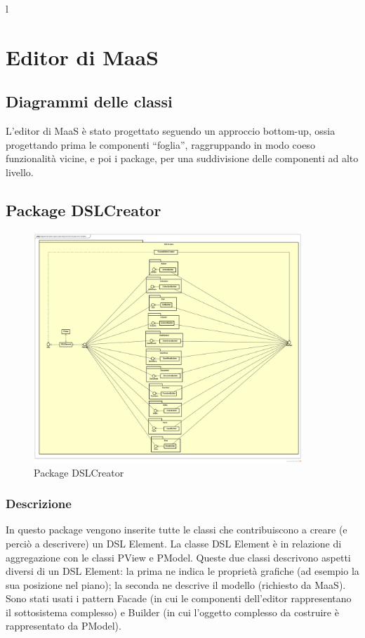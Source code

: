 l\section{Editor di MaaS}
        \subsection{Diagrammi delle classi}
        L'editor di MaaS è stato progettato seguendo un approccio bottom-up, ossia progettando prima le componenti ``foglia'', raggruppando in modo coeso funzionalità vicine, e poi i package, per una suddivisione delle componenti ad alto livello.
        \subsection{Package DSLCreator}
        \begin{figure}[H]
          \centering
          \includegraphics[width=0.9\textwidth]{res/img/diagram_facade.png}
          \caption{Package DSLCreator}
          \label{fig:diagram_model}
        \end{figure}
        \subsubsection{Descrizione}
        In questo package vengono inserite tutte le classi che contribuiscono a creare (e perciò a descrivere) un DSL Element. La classe DSL Element è in relazione di aggregazione con le classi PView e PModel. Queste due classi descrivono aspetti diversi di un DSL Element: la prima ne indica le proprietà grafiche (ad esempio la sua posizione nel piano); la seconda ne descrive il modello (richiesto da MaaS).\\
        Sono stati usati i pattern Facade (in cui le componenti dell'editor rappresentano il sottosistema complesso) e Builder (in cui l'oggetto complesso da costruire è rappresentato da PModel).

